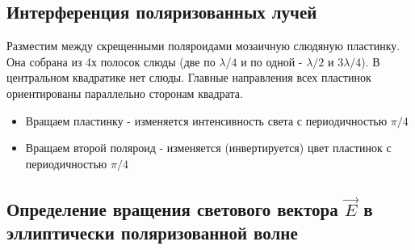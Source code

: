 \documentclass[12pt,a4paper]{article}
\begin{document}
\subsection{Интерференция поляризованных лучей} 

Разместим между скрещенными поляроидами мозаичную слюдяную пластинку. Она собрана из 4х полосок слюды (две по $\lambda/4 $ и по одной - $\lambda/2$ и $3\lambda/4$). В центральном квадратике нет слюды. Главные направления всех пластинок ориентированы параллельно сторонам квадрата. 

\begin{itemize}
\item
Вращаем пластинку - изменяется интенсивность света с периодичностью $\pi/4$ 

\item
Вращаем второй поляроид - изменяется (инвертируется) цвет пластинок с периодичностью $\pi/4$ 

\end{itemize}

\subsection{Определение вращения светового вектора $\vec{E}$ в эллиптически поляризованной волне}
\end{document}
